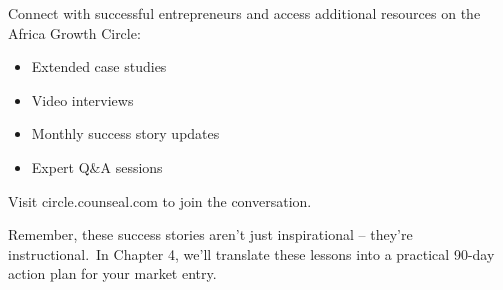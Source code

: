 \begin{communitybox}
Connect with successful entrepreneurs and access additional resources on the Africa Growth Circle:
\begin{itemize}
    \item Extended case studies
    \item Video interviews
    \item Monthly success story updates
    \item Expert Q\&A sessions
\end{itemize}
Visit circle.counseal.com to join the conversation.
\end{communitybox}

\begin{importantbox}
Remember, these success stories aren't just inspirational – they're instructional.\ In Chapter 4, we'll translate these lessons into a practical 90-day action plan for your market entry.
\end{importantbox}